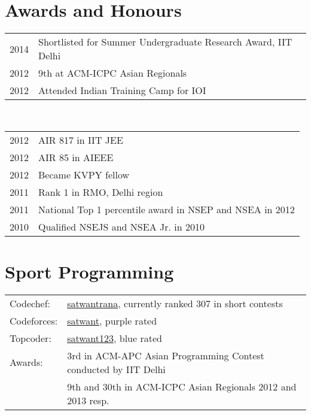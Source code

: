 \documentclass[a4paper,10pt]{article} %
\begin{document}

\section{Awards and Honours}

\begin{tabular}{rl}
2014 & Shortlisted for Summer Undergraduate Research Award, IIT Delhi\\
2012 & 9th at ACM-ICPC Asian Regionals\\
2012 & Attended Indian Training Camp for IOI\\
\end{tabular}\\
\begin{tabular}{rl}
2012 & AIR 817 in IIT JEE\\
2012 & AIR 85 in AIEEE\\
2012 & Became KVPY fellow\\
2011 & Rank 1 in RMO, Delhi region\\
2011 & National Top 1 percentile award in NSEP and NSEA in 2012\\
2010 & Qualified NSEJS and NSEA Jr. in 2010\\

\end{tabular}


\section{Sport Programming}

\begin{tabular}{ll}
Codechef: & \href{http://www.codechef.com/users/satwantrana}{satwantrana}, currently ranked 307 in short contests\\
Codeforces: & \href{http://codeforces.com/profile/satwant}{satwant}, purple rated\\
Topcoder: & \href{http://community.topcoder.com/tc?module=MemberProfile&cr=23152984}{satwant123}, blue rated\\
Awards: & 3rd in ACM-APC Asian Programming Contest conducted by IIT Delhi\\
& 9th and 30th in ACM-ICPC Asian Regionals 2012 and 2013 resp.

\end{tabular}
\end{document}
